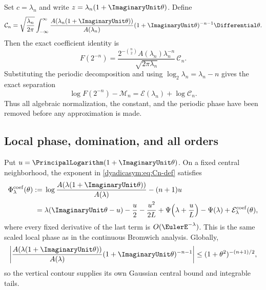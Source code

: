 \documentclass[11pt,oneside]{article}
\theoremstyle{definition}
\theoremstyle{remark}
\begin{document}
Set $c=\lambda_n$ and write $z=\lambda_n(1+\ImaginaryUnit\theta)$.  Define
\begin{equation}
 \mathcal C_n=\sqrt{\frac{\lambda_n}{2\pi}}
 \int_{-\infty}^{\infty}
 \frac{A(\lambda_n(1+\ImaginaryUnit\theta))}{A(\lambda_n)}
 (1+\ImaginaryUnit\theta)^{-n-1}\Differential\theta.                           \label{dyadicasym:eq:Cn-def}
\end{equation}
Then the exact coefficient identity is
\begin{equation}
 F(2^{-n})=
 \frac{2^{-\binom n2}A(\lambda_n)\lambda_n^{-n}}
 {\sqrt{2\pi\lambda_n}}\,\mathcal C_n.                   \label{dyadicasym:eq:exact-coefficient-saddle}
\end{equation}
Substituting the periodic decomposition and using
$\log_2\lambda_n=\lambda_n-n$ gives the exact separation
\begin{equation}
 \boxed{\log F(2^{-n})-\mathcal M_n
 =\mathcal E(\lambda_n)+\log\mathcal C_n.}                \label{dyadicasym:eq:exact-dyadic-separation}
\end{equation}
Thus all algebraic normalization, the constant, and the periodic phase have been removed
before any approximation is made.

\subsection{Local phase, domination, and all orders}

Put $u=\PrincipalLogarithm(1+\ImaginaryUnit\theta)$.  On a fixed central neighborhood, the exponent in
\eqref{dyadicasym:eq:Cn-def} satisfies
\begin{align}
 \Phi_{\lambda}^{\mathrm{coef}}(\theta)
 :={}&\log\frac{A(\lambda(1+\ImaginaryUnit\theta))}{A(\lambda)}-(n+1)u\notag\\
 ={}&\lambda(\ImaginaryUnit\theta-u)-\frac u2-\frac{u^2}{2L}
 +\Psi\!\left(\lambda+\frac uL\right)-\Psi(\lambda)
 +\mathcal E_{\lambda}^{\mathrm{coef}}(\theta),           \label{dyadicasym:eq:coefficient-local-phase}
\end{align}
where every fixed derivative of the last term is $O(\EulerE^{-\lambda})$.  This is the same
scaled local phase as in the continuous Bromwich analysis.  Globally,
\begin{equation}
 \left|\frac{A(\lambda(1+\ImaginaryUnit\theta))}{A(\lambda)}
 (1+\ImaginaryUnit\theta)^{-n-1}\right|
 \le(1+\theta^2)^{-(n+1)/2},                              \label{dyadicasym:eq:coefficient-tail-bound}
\end{equation}
so the vertical contour supplies its own Gaussian central bound and integrable tails.
\end{document}
